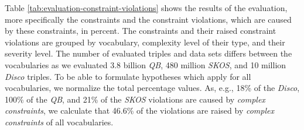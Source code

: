 \documentclass{llncs}
\newcommand{\tb}[1]{\todo[size=\small, color=green!40]{\textbf{Thomas:} #1}}
\begin{document}
{{%
Table \ref{tab:evaluation-constraint-violations} shows the results of the evaluation, more specifically the constraints and the constraint violations, which are caused by these constraints, in percent.
The constraints and their raised constraint violations are grouped by vocabulary, complexity level of their type, and their severity level.
The number of evaluated triples and data sets differs between the vocabularies
as we evaluated 3.8 billion \emph{QB}, 480 million \emph{SKOS}, and 10 million \emph{Disco} triples.
To be able to formulate hypotheses which apply for all vocabularies,  
we normalize the total percentage values.
As, e.g., 18\% of the \emph{Disco}, 100\% of the \emph{QB}, and 21\% of the \emph{SKOS} violations are caused by \emph{complex constraints},  
we calculate that 46.6\% of the violations are raised by \emph{complex constraints} of all vocabularies.

}}
\end{document}
